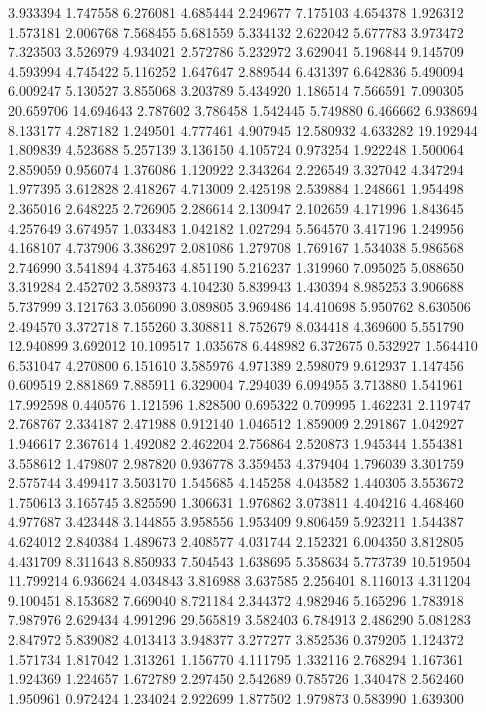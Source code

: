3.933394
1.747558
6.276081
4.685444
2.249677
7.175103
4.654378
1.926312
1.573181
2.006768
7.568455
5.681559
5.334132
2.622042
5.677783
3.973472
7.323503
3.526979
4.934021
2.572786
5.232972
3.629041
5.196844
9.145709
4.593994
4.745422
5.116252
1.647647
2.889544
6.431397
6.642836
5.490094
6.009247
5.130527
3.855068
3.203789
5.434920
1.186514
7.566591
7.090305
20.659706
14.694643
2.787602
3.786458
1.542445
5.749880
6.466662
6.938694
8.133177
4.287182
1.249501
4.777461
4.907945
12.580932
4.633282
19.192944
1.809839
4.523688
5.257139
3.136150
4.105724
0.973254
1.922248
1.500064
2.859059
0.956074
1.376086
1.120922
2.343264
2.226549
3.327042
4.347294
1.977395
3.612828
2.418267
4.713009
2.425198
2.539884
1.248661
1.954498
2.365016
2.648225
2.726905
2.286614
2.130947
2.102659
4.171996
1.843645
4.257649
3.674957
1.033483
1.042182
1.027294
5.564570
3.417196
1.249956
4.168107
4.737906
3.386297
2.081086
1.279708
1.769167
1.534038
5.986568
2.746990
3.541894
4.375463
4.851190
5.216237
1.319960
7.095025
5.088650
3.319284
2.452702
3.589373
4.104230
5.839943
1.430394
8.985253
3.906688
5.737999
3.121763
3.056090
3.089805
3.969486
14.410698
5.950762
8.630506
2.494570
3.372718
7.155260
3.308811
8.752679
8.034418
4.369600
5.551790
12.940899
3.692012
10.109517
1.035678
6.448982
6.372675
0.532927
1.564410
6.531047
4.270800
6.151610
3.585976
4.971389
2.598079
9.612937
1.147456
0.609519
2.881869
7.885911
6.329004
7.294039
6.094955
3.713880
1.541961
17.992598
0.440576
1.121596
1.828500
0.695322
0.709995
1.462231
2.119747
2.768767
2.334187
2.471988
0.912140
1.046512
1.859009
2.291867
1.042927
1.946617
2.367614
1.492082
2.462204
2.756864
2.520873
1.945344
1.554381
3.558612
1.479807
2.987820
0.936778
3.359453
4.379404
1.796039
3.301759
2.575744
3.499417
3.503170
1.545685
4.145258
4.043582
1.440305
3.553672
1.750613
3.165745
3.825590
1.306631
1.976862
3.073811
4.404216
4.468460
4.977687
3.423448
3.144855
3.958556
1.953409
9.806459
5.923211
1.544387
4.624012
2.840384
1.489673
2.408577
4.031744
2.152321
6.004350
3.812805
4.431709
8.311643
8.850933
7.504543
1.638695
5.358634
5.773739
10.519504
11.799214
6.936624
4.034843
3.816988
3.637585
2.256401
8.116013
4.311204
9.100451
8.153682
7.669040
8.721184
2.344372
4.982946
5.165296
1.783918
7.987976
2.629434
4.991296
29.565819
3.582403
6.784913
2.486290
5.081283
2.847972
5.839082
4.013413
3.948377
3.277277
3.852536
0.379205
1.124372
1.571734
1.817042
1.313261
1.156770
4.111795
1.332116
2.768294
1.167361
1.924369
1.224657
1.672789
2.297450
2.542689
0.785726
1.340478
2.562460
1.950961
0.972424
1.234024
2.922699
1.877502
1.979873
0.583990
1.639300

